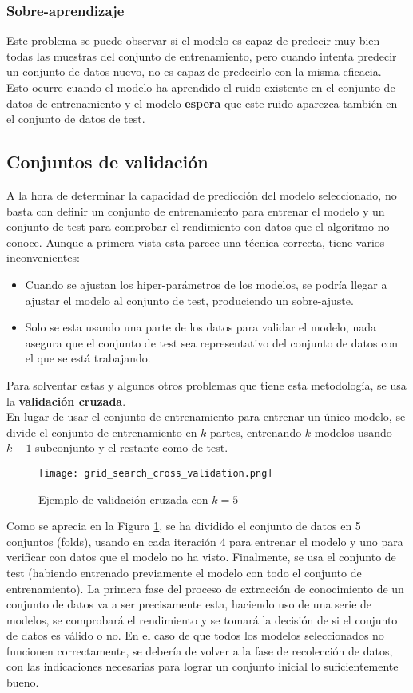 \subsubsection*{Sobre-aprendizaje}
Este problema se puede observar si el modelo es capaz de predecir muy bien todas las muestras del conjunto de entrenamiento, pero cuando intenta predecir un conjunto de datos nuevo, no es capaz de predecirlo con la misma eficacia.\\
Esto ocurre cuando el modelo ha aprendido el ruido existente en el conjunto de datos de entrenamiento y el modelo \textbf{espera} que este ruido aparezca también en el conjunto de datos de test. 
\subsection{Conjuntos de validación}
\label{sec:validation}
A la hora de determinar la capacidad de predicción del modelo seleccionado, no basta con definir un conjunto de entrenamiento para entrenar el modelo y un conjunto de test para comprobar el rendimiento con datos que el algoritmo no conoce. Aunque a primera vista esta parece una técnica correcta, tiene varios inconvenientes:
\begin{itemize}
	\item Cuando se ajustan los hiper-parámetros de los modelos, se podría llegar a ajustar el modelo al conjunto de test, produciendo un sobre-ajuste.
	\item Solo se esta usando una parte de los datos para validar el modelo, nada asegura que el conjunto de test sea representativo del conjunto de datos con el que se está trabajando.
\end{itemize}
Para solventar estas y algunos otros problemas que tiene esta metodología, se usa la \textbf{validación cruzada}.\\
\linebreak
En lugar de usar el conjunto de entrenamiento para entrenar un único modelo, se divide el conjunto de entrenamiento en $k$ partes, entrenando $k$ modelos usando $k-1$ subconjunto y el restante como de test. \\
\begin{figure}[H]
	\centering
	\texttt{[image: grid\_search\_cross\_validation.png]}
	\caption{Ejemplo de validación cruzada con $k=5$}
	\label{fig:cross-validation}
\end{figure}
Como se aprecia en la Figura \ref{fig:cross-validation}, se ha dividido el conjunto de datos en 5 conjuntos (folds), usando en cada iteración 4 para entrenar el modelo y uno para verificar con datos que el modelo no ha visto. Finalmente, se usa el conjunto de test (habiendo entrenado previamente el modelo con todo el conjunto de entrenamiento).
La primera fase del proceso de extracción de conocimiento de un conjunto de datos va a ser precisamente esta, haciendo uso de una serie de modelos, se comprobará el rendimiento y se tomará la decisión de si el conjunto de datos es válido o no. En el caso de que todos los modelos seleccionados no funcionen correctamente, se debería de volver a la fase de recolección de datos, con las indicaciones necesarias para lograr un conjunto inicial lo suficientemente bueno.
